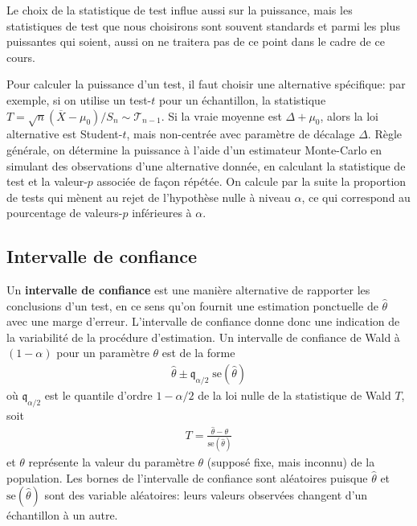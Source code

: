 \documentclass[
  11pt,
  letterpaper,
]{book}
\begin{document}
Le choix de la statistique de test influe aussi sur la puissance, mais les statistiques de test que nous choisirons sont souvent standards et parmi les plus puissantes qui soient, aussi on ne traitera pas de ce point dans le cadre de ce cours.

Pour calculer la puissance d'un test, il faut choisir une alternative spécifique: par exemple, si on utilise un test-\(t\) pour un échantillon, la statistique \(T=\sqrt{n}(\overline{X}-\mu_0)/S_n \sim \mathcal{T}_{n-1}\). Si la vraie moyenne est \(\Delta + \mu_0\), alors la loi alternative est Student-\(t\), mais non-centrée avec paramètre de décalage \(\Delta\). Règle générale, on détermine la puissance à l'aide d'un estimateur Monte-Carlo en simulant des observations d'une alternative donnée, en calculant la statistique de test et la valeur-\(p\) associée de façon répétée. On calcule par la suite la proportion de tests qui mènent au rejet de l'hypothèse nulle à niveau \(\alpha\), ce qui correspond au pourcentage de valeurs-\(p\) inférieures à \(\alpha\).

\hypertarget{intervalle-de-confiance}{%
\subsection{Intervalle de confiance}\label{intervalle-de-confiance}}

Un \textbf{intervalle de confiance} est une manière alternative de rapporter les conclusions d'un test, en ce sens qu'on fournit une estimation ponctuelle de \(\hat{\theta}\) avec une marge d'erreur. L'intervalle de confiance donne donc une indication de la variabilité de la procédure d'estimation. Un intervalle de confiance de Wald à \((1-\alpha)\) pour un paramètre \(\theta\) est de la forme
\begin{align*}
\widehat{\theta} \pm \mathfrak{q}_{\alpha/2} \; \mathrm{se}(\widehat{\theta})
\end{align*}
où \(\mathfrak{q}_{\alpha/2}\) est le quantile d'ordre \(1-\alpha/2\) de la loi nulle de la statistique de Wald \(T\), soit
\begin{align*}
T =\frac{\widehat{\theta}-\theta}{\mathrm{se}(\widehat{\theta})}
\end{align*}
et \(\theta\) représente la valeur du paramètre \(\theta\) (supposé fixe, mais inconnu) de la population. Les bornes de l'intervalle de confiance sont aléatoires puisque \(\widehat{\theta}\) et \(\mathrm{se}(\widehat{\theta})\) sont des variable aléatoires: leurs valeurs observées changent d'un échantillon à un autre.
\end{document}
